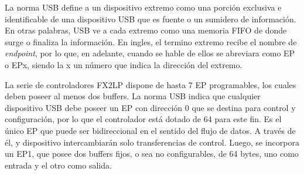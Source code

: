 	La norma USB define a un dispositivo extremo como una porción exclusiva e identificable de una dispositivo USB que es fuente o un sumidero de información. En otras palabras, USB ve a cada extremo como una memoria FIFO de donde surge o finaliza la información. En ingles, el termino extremo recibe el nombre de {\it endpoint}, por lo que, en adelante, cuando se hable de ellos se abreviara como EP o EPx, siendo la x un número que indica la dirección del extremo.%
	
	La serie de controladores FX2LP dispone de hasta 7 EP programables, los cuales deben poseer al menos dos buffers. La norma USB indica que cualquier dispositivo USB debe poseer un EP con dirección 0 que se destina para control y configuración, por lo que el controlador está dotado de \SI{64}{\byte} para este fin. Es el único EP que puede ser bidireccional en el sentido del flujo de datos. A través de él, \host y dispositivo intercambiarán solo transferencias de control. Luego, se incorpora un EP1, que posee dos buffers fijos, o sea no configurables, de 64 bytes, uno como entrada y el otro como salida.%
	
